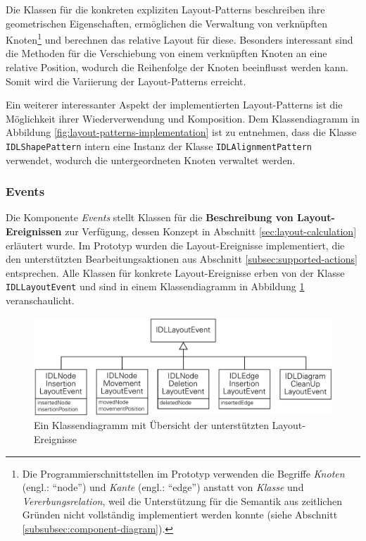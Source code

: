 Die Klassen für die konkreten expliziten Layout-Patterns beschreiben ihre geometrischen Eigenschaften, ermöglichen die Verwaltung von verknüpften Knoten\footnote{Die Programmierschnittstellen im Prototyp verwenden die Begriffe \textit{Knoten} (engl.: \enquote{node}) und \textit{Kante} (engl.: \enquote{edge}) anstatt von \textit{Klasse} und \textit{Vererbungsrelation}, weil die Unterstützung für die Semantik aus zeitlichen Gründen nicht vollständig implementiert werden konnte (siehe Abschnitt \ref{subsubsec:component-diagram}).} und berechnen das relative Layout für diese. Besonders interessant sind die Methoden für die Verschiebung von einem verknüpften Knoten an eine relative Position, wodurch die Reihenfolge der Knoten beeinflusst werden kann. Somit wird die Variierung der Layout-Patterns erreicht.

Ein weiterer interessanter Aspekt der implementierten Layout-Patterns ist die Möglichkeit ihrer Wiederverwendung und Komposition. Dem Klassendiagramm in Abbildung \ref{fig:layout-patterns-implementation} ist zu entnehmen, dass die Klasse \texttt{IDLShapePattern} intern eine Instanz der Klasse \texttt{IDLAlignmentPattern} verwendet, wodurch die untergeordneten Knoten verwaltet werden.

\subsubsection{Events}
\label{subsubsec:component-events}

Die Komponente \textit{Events} stellt Klassen für die \textbf{Beschreibung von Layout-Ereignissen} zur Verfügung, dessen Konzept in Abschnitt \ref{sec:layout-calculation} erläutert wurde. Im Prototyp wurden die Layout-Ereignisse implementiert, die den unterstützten Bearbeitungsaktionen aus Abschnitt \ref{subsec:supported-actions} entsprechen. Alle Klassen für konkrete Layout-Ereignisse erben von der Klasse \texttt{IDLLayoutEvent} und sind in einem Klassendiagramm in Abbildung \ref{fig:layout-events-implementation} veranschaulicht.

\begin{figure}[hbt]
    \centering
    \includegraphics[scale=0.8]{resources/layout-events-implementation}
    \caption{Ein Klassendiagramm mit Übersicht der unterstützten Layout-Ereignisse}
    \label{fig:layout-events-implementation}
\end{figure}

